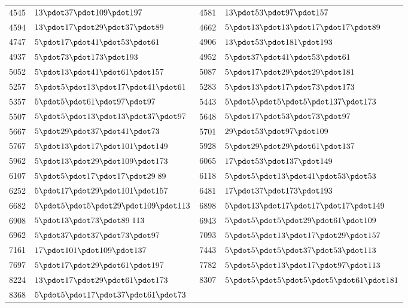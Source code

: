 \begin{longtable}{@{}r|l@{\qquad}r|l@{}}
4545 & $13\pdot 37\pdot 109\pdot 197$ & 4581 & $13\pdot 53\pdot 97\pdot 157$\\
4594 & $13\pdot 17\pdot 29\pdot 37\pdot 89$ & 4662 & $5\pdot 13\pdot 13\pdot 17\pdot 17\pdot 89$\\
4747 & $5\pdot 17\pdot 41\pdot 53\pdot 61$ & 4906 & $13\pdot 53\pdot 181\pdot 193$\\
4937 & $5\pdot 73\pdot 173\pdot 193$ & 4952 & $5\pdot 37\pdot 41\pdot 53\pdot 61$\\
5052 & $5\pdot 13\pdot 41\pdot 61\pdot 157$ & 5087 & $5\pdot 17\pdot 29\pdot 29\pdot 181$\\
5257 & $5\pdot 5\pdot 13\pdot 17\pdot 41\pdot 61$ & 5283 & $5\pdot 13\pdot 17\pdot 73\pdot 173$\\
5357 & $5\pdot 5\pdot 61\pdot 97\pdot 97$ & 5443 & $5\pdot 5\pdot 5\pdot 5\pdot 137\pdot 173$\\
5507 & $5\pdot 5\pdot 13\pdot 13\pdot 37\pdot 97$ & 5648 & $5\pdot 17\pdot 53\pdot 73\pdot 97$\\
5667 & $5\pdot 29\pdot 37\pdot 41\pdot 73$ & 5701 & $29\pdot 53\pdot 97\pdot 109$\\
5767 & $5\pdot 13\pdot 17\pdot 101\pdot 149$ & 5928 & $5\pdot 29\pdot 29\pdot 61\pdot 137$\\
5962 & $5\pdot 13\pdot 29\pdot 109\pdot 173$ & 6065 & $17\pdot 53\pdot 137\pdot 149$\\
6107 & $5\pdot 5\pdot 17\pdot 17\pdot 29\;89$ & 6118 & $5\pdot 5\pdot 13\pdot 41\pdot 53\pdot 53$\\
6252 & $5\pdot 17\pdot 29\pdot 101\pdot 157$ & 6481 & $17\pdot 37\pdot 173\pdot 193$\\
6682 & $5\pdot 5\pdot 5\pdot 29\pdot 109\pdot 113$ & 6898 & $5\pdot 13\pdot 17\pdot 17\pdot 17\pdot 149$\\
6908 & $5\pdot 13\pdot 73\pdot 89\;113$ & 6943 & $5\pdot 5\pdot 5\pdot 29\pdot 61\pdot 109$\\
6962 & $5\pdot 37\pdot 37\pdot 73\pdot 97$ & 7093 & $5\pdot 5\pdot 13\pdot 17\pdot 29\pdot 157$\\
7161 & $17\pdot 101\pdot 109\pdot 137$ & 7443 & $5\pdot 5\pdot 5\pdot 37\pdot 53\pdot 113$\\
7697 & $5\pdot 17\pdot 29\pdot 61\pdot 197$ & 7782 & $5\pdot 5\pdot 13\pdot 17\pdot 97\pdot 113$\\
8224 & $13\pdot 17\pdot 29\pdot 61\pdot 173$ & 8307 & $5\pdot 5\pdot 5\pdot 5\pdot 5\pdot 61\pdot 181$\\
8368 & $5\pdot 5\pdot 17\pdot 37\pdot 61\pdot 73$ &  & \\
\end{longtable}\endgroup
